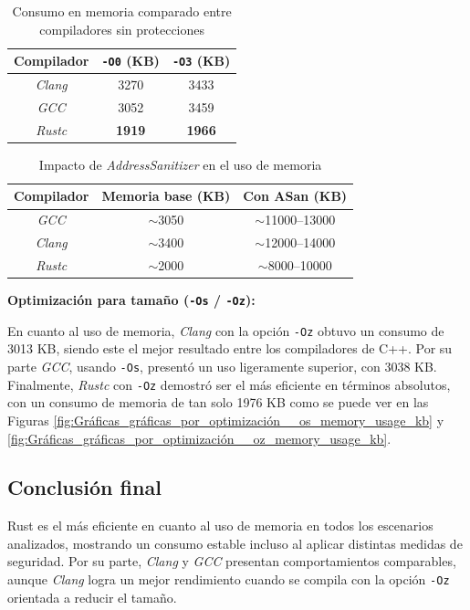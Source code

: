 \begin{table}[H]
\centering
\footnotesize
\begin{tabular}{|c|c|c|}
\hline
\textbf{Compilador} & \textbf{\texttt{-O0} (KB)} & \textbf{\texttt{-O3} (KB)} \\
\hline
\emph{Clang} & 3270 & 3433 \\
\emph{GCC} & 3052 & 3459 \\
\emph{Rustc} & \textbf{1919} & \textbf{1966} \\
\hline
\end{tabular}
\caption{Consumo en memoria comparado entre compiladores sin protecciones}
\label{tab:compiladores_sin_prote}
\end{table}

\begin{table}[H]
\centering
\footnotesize
\begin{tabular}{|c|c|c|}
\hline
\textbf{Compilador} & \textbf{Memoria base (KB)} & \textbf{Con ASan (KB)} \\
\hline
\emph{GCC} & $\sim$3050 & $\sim$11000--13000 \\
\emph{Clang} & $\sim$3400 & $\sim$12000--14000 \\
\emph{Rustc} & $\sim$2000 & $\sim$8000--10000 \\
\hline
\end{tabular}
\caption{Impacto de \emph{AddressSanitizer} en el uso de memoria}
\label{tab:memoria_intensiva}
\end{table}


\textbf{Optimización para tamaño (\texttt{-Os} / \texttt{-Oz}):}

En cuanto al uso de memoria, \emph{Clang} con la opción \texttt{-Oz} obtuvo un consumo de 3013 KB, siendo este el mejor resultado entre los compiladores de C++. Por su parte \emph{GCC}, usando \texttt{-Os}, presentó un uso ligeramente superior, con 3038 KB. Finalmente, \emph{Rustc} con \texttt{-Oz} demostró ser el más eficiente en términos absolutos, con un consumo de memoria de tan solo 1976 KB como se puede ver en las Figuras \ref{fig:Gráficas_gráficas_por_optimización__os_memory_usage_kb} y \ref{fig:Gráficas_gráficas_por_optimización__oz_memory_usage_kb}.

\subsection*{Conclusión final}

Rust es el más eficiente en cuanto al uso de memoria en todos los escenarios analizados, mostrando un consumo estable incluso al aplicar distintas medidas de seguridad. Por su parte, \emph{Clang} y \emph{GCC} presentan comportamientos comparables, aunque \emph{Clang} logra un mejor rendimiento cuando se compila con la opción \texttt{-Oz} orientada a reducir el tamaño.

